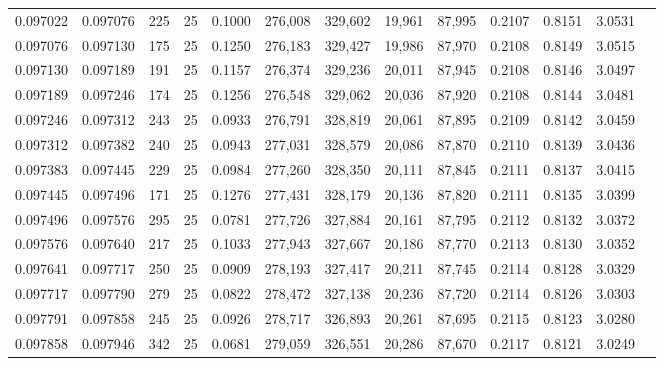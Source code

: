 \begin{tabular}{rrrrrrrrrrrrr}
0.097022 & 0.097076 &   225 &  25 &                                     0.1000 & 276,008 & 329,602 &  19,961 &  87,995 & 0.2107 & 0.8151 & 3.0531 \\
0.097076 & 0.097130 &   175 &  25 &                                     0.1250 & 276,183 & 329,427 &  19,986 &  87,970 & 0.2108 & 0.8149 & 3.0515 \\
0.097130 & 0.097189 &   191 &  25 &                                     0.1157 & 276,374 & 329,236 &  20,011 &  87,945 & 0.2108 & 0.8146 & 3.0497 \\
0.097189 & 0.097246 &   174 &  25 &                                     0.1256 & 276,548 & 329,062 &  20,036 &  87,920 & 0.2108 & 0.8144 & 3.0481 \\
0.097246 & 0.097312 &   243 &  25 &                                     0.0933 & 276,791 & 328,819 &  20,061 &  87,895 & 0.2109 & 0.8142 & 3.0459 \\
0.097312 & 0.097382 &   240 &  25 &                                     0.0943 & 277,031 & 328,579 &  20,086 &  87,870 & 0.2110 & 0.8139 & 3.0436 \\
0.097383 & 0.097445 &   229 &  25 &                                     0.0984 & 277,260 & 328,350 &  20,111 &  87,845 & 0.2111 & 0.8137 & 3.0415 \\
0.097445 & 0.097496 &   171 &  25 &                                     0.1276 & 277,431 & 328,179 &  20,136 &  87,820 & 0.2111 & 0.8135 & 3.0399 \\
0.097496 & 0.097576 &   295 &  25 &                                     0.0781 & 277,726 & 327,884 &  20,161 &  87,795 & 0.2112 & 0.8132 & 3.0372 \\
0.097576 & 0.097640 &   217 &  25 &                                     0.1033 & 277,943 & 327,667 &  20,186 &  87,770 & 0.2113 & 0.8130 & 3.0352 \\
0.097641 & 0.097717 &   250 &  25 &                                     0.0909 & 278,193 & 327,417 &  20,211 &  87,745 & 0.2114 & 0.8128 & 3.0329 \\
0.097717 & 0.097790 &   279 &  25 &                                     0.0822 & 278,472 & 327,138 &  20,236 &  87,720 & 0.2114 & 0.8126 & 3.0303 \\
0.097791 & 0.097858 &   245 &  25 &                                     0.0926 & 278,717 & 326,893 &  20,261 &  87,695 & 0.2115 & 0.8123 & 3.0280 \\
0.097858 & 0.097946 &   342 &  25 &                                     0.0681 & 279,059 & 326,551 &  20,286 &  87,670 & 0.2117 & 0.8121 & 3.0249 \\

\end{tabular}
